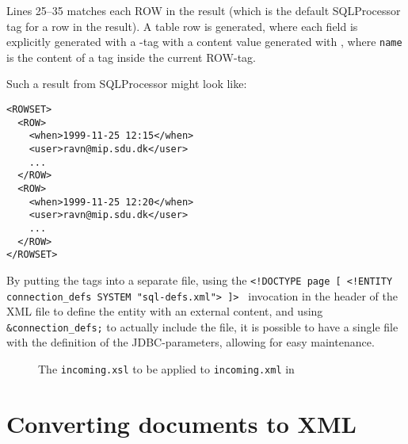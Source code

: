 Lines 25--35 matches each ROW in the result (which is the default
SQLProcessor tag for a row in the result).  A table row is generated,
where each field is explicitly generated with a -tag with a
content value generated with , where
\texttt{name} is the content of a tag inside the current ROW-tag.

Such a result from SQLProcessor might look like:
\begin{verbatim}
<ROWSET>
  <ROW>
    <when>1999-11-25 12:15</when>
    <user>ravn@mip.sdu.dk</user>
    ...
  </ROW>
  <ROW>
    <when>1999-11-25 12:20</when>
    <user>ravn@mip.sdu.dk</user>
    ...
  </ROW>
</ROWSET>
\end{verbatim}

By putting the  tags into a separate file, using
the \texttt{<!DOCTYPE page [ <!ENTITY connection_defs SYSTEM
"sql-defs.xml"> ]> } invocation in the header of the XML file to
define the entity with an external content, and using
\texttt{\&connection_defs;} to actually include the file, it is
possible to have a single file with the definition of the
JDBC-parameters, allowing for easy maintenance.

\begin{figure}[tbp]
  \begin{center}
    \caption{The \texttt{incoming.xsl} to be applied to
      \texttt{incoming.xml} in
      } 
    \label{fig:src-public_html-incoming.xsl}
  \end{center}
\end{figure}

\section{Converting documents to XML}


